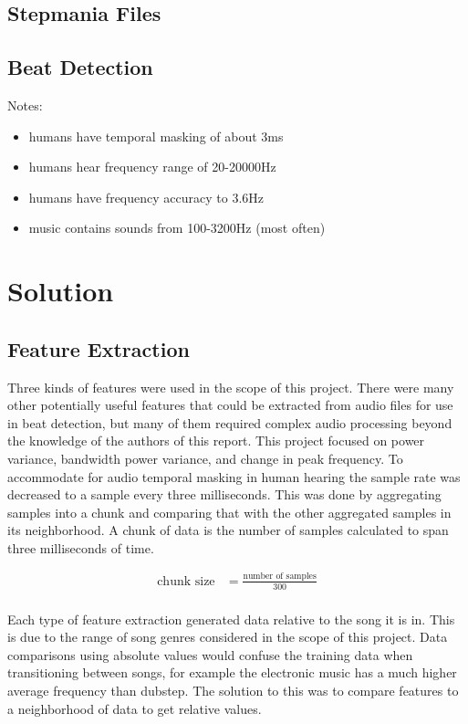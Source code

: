\documentclass[12pt]{article}
\begin{document}
\subsection{Stepmania Files}

\subsection{Beat Detection}
Notes:
	\begin{itemize}
		\item humans have temporal masking of about 3ms
		\item humans hear frequency range of 20-20000Hz
		\item humans have frequency accuracy to 3.6Hz
		\item music contains sounds from 100-3200Hz (most often)
	\end{itemize}


\section{Solution}

\subsection{Feature Extraction}
Three kinds of features were used in the scope of this project. There were many other potentially useful features that could be extracted from audio files for use in beat detection, but many of them required complex audio processing beyond the knowledge of the authors of this report. This project focused on power variance, bandwidth power variance, and change in peak frequency. To accommodate for audio temporal masking in human hearing the sample rate was decreased to a sample every three milliseconds. This was done by aggregating samples into a chunk and comparing that with the other aggregated samples in its neighborhood. A chunk of data is the number of samples calculated to span three milliseconds of time.

\begin{align*}
	\text{chunk size} &= \frac{\text{number of samples}}{300}\\
\end{align*}

Each type of feature extraction generated data relative to the song it is in. This is due to the range of song genres considered in the scope of this project. Data comparisons using absolute values would confuse the training data when transitioning between songs, for example the electronic music has a much higher average frequency than dubstep. The solution to this was to compare features to a neighborhood of data to get relative values.
\end{document}
